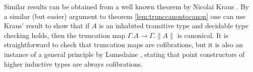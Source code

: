 \documentclass[a4paper]{amsart}
\newtheorem{corollary}[theorem]{Corollary}
\newtheorem{remark}[theorem]{Remark}
\theoremstyle{definition}
\newcommand{\transit}{\operatorname{Transitive}}
\begin{document}





Similar results can be obtained from a well known theorem by Nicolai
Kraus \cite[Section 8.4]{kectanonex}. By a similar (but easier)
argument to theorem \ref{lem:trunccanontocanon} one can use Kraus'
result to show that if $A$ is an inhabited transitive type and
decidable type checking holds, then the truncation map
$\Gamma.A \to \Gamma.\|A\|$ is canonical. It is straightforward to
check that truncation maps are cofibrations, but it is also an
instance of a general principle by Lumsdaine \cite{lumsdainecofibtt},
stating that point constructors of higher inductive types are always
cofibrations.
\end{document}
